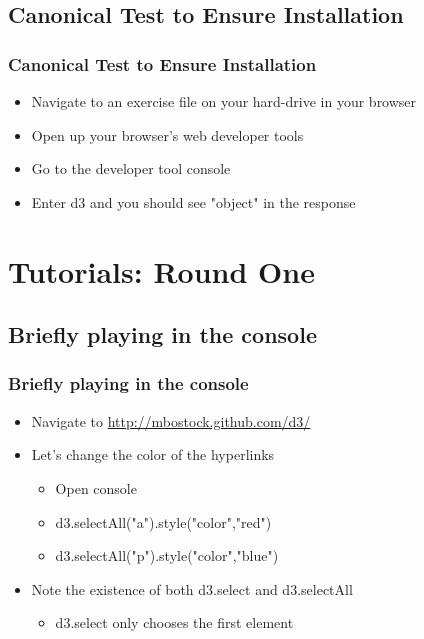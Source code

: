 \documentclass{beamer}
\begin{document}
\subsection{Canonical Test to Ensure Installation}

\begin{frame}
    \frametitle{Canonical Test to Ensure Installation}
    \begin{itemize}
\pause
    \item Navigate to an exercise file on your hard-drive in your browser
\pause
    \item Open up your browser's web developer tools
\pause
    \item Go to the developer tool console
\pause
    \item Enter d3 and you should see "object" in the response
\pause
    \end{itemize}
\end{frame}




\section{Tutorials: Round One}

\subsection{Briefly playing in the console}

\begin{frame}
    \frametitle{Briefly playing in the console}
    \begin{itemize}
    \item Navigate to \href{http://mbostock.github.com/d3/}{http://mbostock.github.com/d3/}
    \item Let's change the color of the hyperlinks
        \begin{itemize}
        \item Open console
        \item d3.selectAll("a").style("color","red")
        \item d3.selectAll("p").style("color","blue")
        \end{itemize}
    \item Note the existence of both d3.select and d3.selectAll
        \begin{itemize}
        \item d3.select only chooses the first element
        \end{itemize}
    \end{itemize}
\end{frame}
\end{document}
